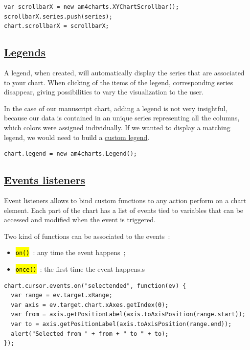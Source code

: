 \documentclass[a4paper,12pt,twoside]{book}
\let\OldTexttt\texttt
\renewcommand{\texttt}[1]{\OldTexttt{\hl{#1}}}
\begin{document}
\begin{lstlisting}
var scrollbarX = new am4charts.XYChartScrollbar();
scrollbarX.series.push(series);
chart.scrollbarX = scrollbarX;
\end{lstlisting}

			\subsection{\href{https://www.amcharts.com/docs/v4/concepts/legend/}{Legends}}\label{legends}

A legend, when created, will automatically display the series that are associated to your chart. When clicking of the items of the legend, corresponding series disappear, giving possibilities to vary the visualization to the user.

In the case of our manuscript chart, adding a legend is not very insightful, because our data is contained in an unique series representing all the columns, which colors were assigned individually. If we wanted to display a matching legend, we would need to build a \href{https://www.amcharts.com/docs/v4/concepts/legend/\#Adding_custom_items}{custom legend}.

\begin{lstlisting}
chart.legend = new am4charts.Legend();
\end{lstlisting}

			\subsection{\href{https://www.amcharts.com/docs/v4/concepts/event-listeners/}{Events listeners}}\label{events-listeners}

Event listeners allows to bind custom functions to any action perform on a chart element. Each part of the chart has a list of events tied to variables that can be accessed and modified when the event is triggered.

Two kind of functions can be associated to the events~:
\begin{itemize}
	\item \texttt{on()}~: any time the event happens~;
	\item \texttt{once()}~: the first time the event happens.s
\end{itemize}

\begin{lstlisting}
chart.cursor.events.on("selectended", function(ev) {
  var range = ev.target.xRange;
  var axis = ev.target.chart.xAxes.getIndex(0);
  var from = axis.getPositionLabel(axis.toAxisPosition(range.start));
  var to = axis.getPositionLabel(axis.toAxisPosition(range.end));
  alert("Selected from " + from + " to " + to);
});
\end{lstlisting}
\end{document}
